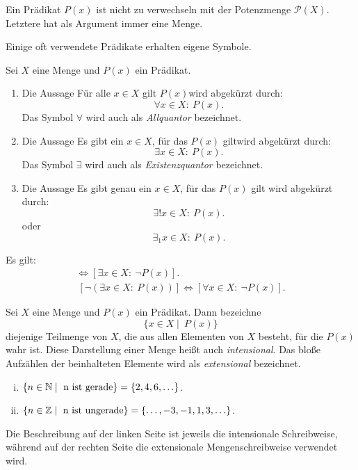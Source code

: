 \begin{remark}
Ein Prädikat $P(x)$ ist nicht zu verwechseln mit der Potenzmenge
$\mathcal{P}(X)$.
Letztere hat als Argument immer eine Menge.
\end{remark}

\vspace*{1em}
Einige oft verwendete Prädikate erhalten eigene Symbole.

\begin{mydef}
Sei $X$ eine Menge und $P(x)$ ein Prädikat.
\begin{enumerate}
\item Die Aussage \glqq Für alle $x \in X$ gilt $P(x)$\grqq wird abgekürzt
durch:
\[
  \forall x \in X\!:\ P(x).
\]
Das Symbol $\forall$ wird auch als \textit{Allquantor} bezeichnet.

\item Die Aussage \glqq Es gibt ein $x \in X$, für das $P(x)$ gilt\grqq wird
abgekürzt durch:
\[
  \exists x \in X\!:\ P(x).
\]
Das Symbol $\exists$ wird auch als \textit{Existenzquantor} bezeichnet.

\item Die Aussage \glqq Es gibt genau ein $x \in X$, für das $P(x)$ gilt\grqq
wird abgekürzt durch:
\[
  \exists ! x \in X\!:\ P(x).
\]
oder
\[
  \exists_1 x \in X\!:\ P(x).
\]
\end{enumerate}
\end{mydef}


\begin{remark}
Es gilt:
\begin{align*}
  [ \neg (\forall x \in X\!:\ P(x))] \iff [\exists x \in X\!:\ \neg P(x)]. \\\
  [ \neg (\exists x \in X\!:\ P(x))] \iff [\forall x \in X\!:\ \neg P(x)].
\end{align*}
\end{remark}


\begin{mydef}
Sei $X$ eine Menge und $P(x)$ ein Prädikat.
Dann bezeichne
\[
  \{ x \in X \mid\ P(x) \}
\]
diejenige Teilmenge von $X$, die aus allen Elementen von $X$ besteht,
für die $P(x)$ wahr ist.
Diese Darstellung einer Menge heißt auch \textit{intensional}.
Das bloße Aufzählen der beinhalteten Elemente wird als \textit{extensional}
bezeichnet.
\end{mydef}


\begin{example}
\begin{enumerate}[(i)]
\item $\{n \in \mathbb{N} \mid\ \text{n ist gerade} \} = \{2,4,6,\ldots\}$.
\item $\{n \in \mathbb{Z} \mid\ \text{n ist ungerade} \} = \{\ldots,-3,-1,1,3,\ldots\}$.
\end{enumerate}

Die Beschreibung auf der linken Seite ist jeweils die intensionale Schreibweise,
während auf der rechten Seite die extensionale Mengenschreibweise verwendet wird.
\end{example}


